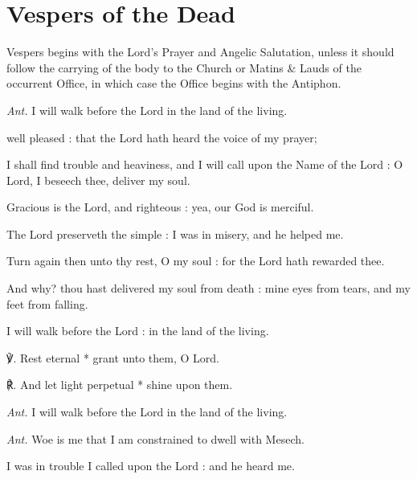 \section{Vespers of the Dead}
\begin{secrubric}
Vespers begins with the Lord's Prayer and Angelic Salutation, unless it should follow the carrying of the body to the Church or Matins \& Lauds of the occurrent Office, in which case the Office begins with the Antiphon.
\end{secrubric}
\par\noindent
\textit{Ant.} I will walk {\dag} before the Lord in the land of the living.\par
{} well pleased : that the Lord hath heard the voice of my prayer;\par
{}
I shall find trouble and heaviness, and I will call upon the Name of the Lord : O Lord, I beseech thee, deliver my soul.\par
{}Gracious is the Lord, and righteous : yea, our God is merciful.\par
{}The Lord preserveth the simple : I was in misery, and he helped me.\par
{}Turn again then unto thy rest, O my soul : for the Lord hath rewarded thee.\par
{}And why? thou hast delivered my soul from death : mine eyes from tears, and my feet from falling.\par
{}I will walk before the Lord : in the land of the living.
\par
℣. Rest eternal * grant unto them, O Lord.\par
℟. And let light perpetual * shine upon them.\par\noindent
\textit{Ant.} I will walk before the Lord in the land of the living.
\par\noindent
\textit{Ant.} Woe is me {\dag} that I am constrained to dwell with Mesech.\par
{} I was in trouble I called upon the Lord : and he heard me.\par
{}
